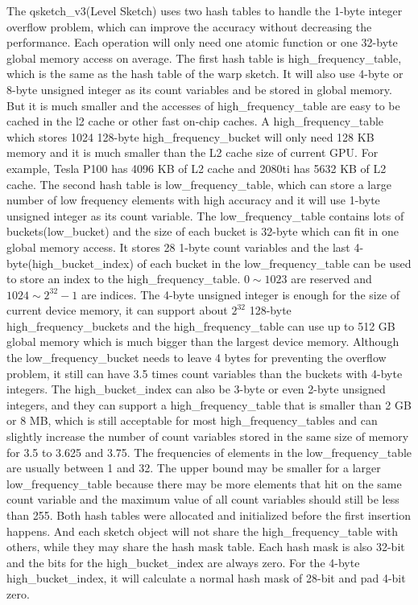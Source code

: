 \documentclass[conference]{IEEEtran}
\begin{document}
The qsketch\_v3(Level Sketch) uses two hash tables to handle the 1-byte integer overflow problem, which can improve the accuracy without decreasing the performance. Each operation will only need one atomic function or one 32-byte global memory access on average. The first hash table is high\_frequency\_table, which is the same as the hash table of the warp sketch. It will also use 4-byte or 8-byte unsigned integer as its count variables and be stored in global memory. But it is much smaller and the accesses of high\_frequency\_table are easy to be cached in the l2 cache or other fast on-chip caches. A high\_frequency\_table which stores 1024 128-byte high\_frequency\_bucket will only need 128 KB memory and it is much smaller than the L2 cache size of current GPU. For example, Tesla P100 has 4096 KB of L2 cache and 2080ti has 5632 KB of L2 cache.
The second hash table is low\_frequency\_table, which can store a large number of low frequency elements with high accuracy and it will use 1-byte unsigned integer as its count variable. The low\_frequency\_table contains lots of buckets(low\_bucket) and the size of each bucket is 32-byte which can fit in one global memory access. It stores 28 1-byte count variables and the last 4-byte(high\_bucket\_index) of each bucket in the low\_frequency\_table can be used to store an index to the high\_frequency\_table. $0 \sim 1023$ are reserved and $1024 \sim 2 ^ {32} - 1$ are indices. The 4-byte unsigned integer is enough for the size of current device memory, it can support about $2 ^ {32} $ 128-byte high\_frequency\_buckets and the high\_frequency\_table can use up to 512 GB global memory which is much bigger than the largest device memory. Although the low\_frequency\_bucket needs to leave 4 bytes for preventing the overflow problem, it still can have 3.5 times count variables than the buckets with 4-byte integers.
The high\_bucket\_index can also be 3-byte or even 2-byte unsigned integers, and they can support a high\_frequency\_table that is smaller than 2 GB or 8 MB, which is still acceptable for most high\_frequency\_tables and can slightly increase the number of count variables stored in the same size of memory for 3.5 to 3.625 and 3.75. The frequencies of elements in the low\_frequency\_table are usually between 1 and 32. The upper bound may be smaller for a larger low\_frequency\_table because there may be more elements that hit on the same count variable and the maximum value of all count variables should still be less than 255. Both hash tables were allocated and initialized before the first insertion happens. And each sketch object will not share the high\_frequency\_table with others, while they may share the hash mask table. Each hash mask is also 32-bit and the bits for the high\_bucket\_index are always zero. For the 4-byte high\_bucket\_index, it will calculate a normal hash mask of 28-bit and pad 4-bit zero. %
\end{document}

